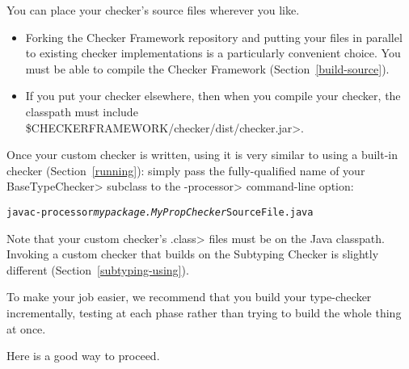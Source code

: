 
You can place your checker's source files wherever you like.
\begin{itemize}
\item
  Forking the Checker Framework repository and putting your files in
  parallel to existing checker implementations is a particularly convenient
  choice.  You must be able to compile the Checker Framework
  (Section~\ref{build-source}).
\item
  \begin{sloppypar}
  If you put your checker elsewhere, then when you compile your checker,
  the classpath must include \<\$CHECKERFRAMEWORK/checker/dist/checker.jar>.
  \end{sloppypar}
\end{itemize}


Once your custom checker is written, using it is very similar to using a
built-in checker (Section~\ref{running}):
simply pass the fully-qualified name of your \<BaseTypeChecker>
subclass to the \<-processor> command-line option:
\begin{alltt}
  javac -processor \textit{mypackage.MyPropChecker} SourceFile.java
\end{alltt}
Note that your custom checker's
\<.class> files must be on the Java classpath.
Invoking a custom checker that builds on
the Subtyping Checker is slightly different (Section~\ref{subtyping-using}).




To make your job easier, we recommend that you build your type-checker
incrementally, testing at each phase rather than trying to build the whole
thing at once.

Here is a good way to proceed.

